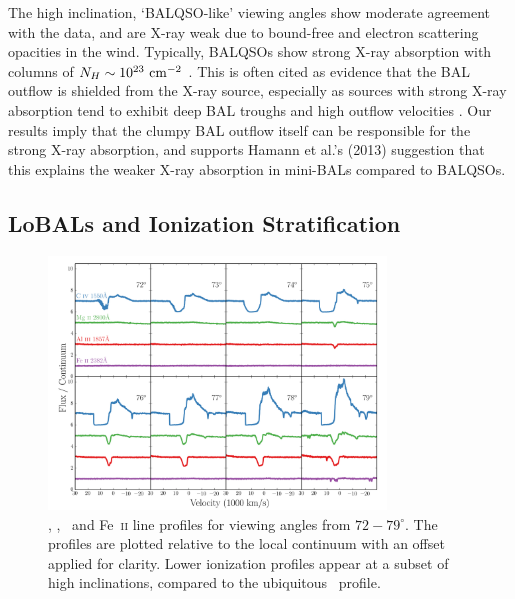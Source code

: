 \documentclass[useAMS,usenatbib]{mn2e_x}
\begin{document}
The high inclination, `BALQSO-like' viewing angles show moderate agreement with the data,
and are X-ray weak due to bound-free and electron scattering opacities in the wind.
Typically, BALQSOs show strong X-ray absorption with columns 
of $N_H\sim10^{23}~\rm{cm^{-2}}$ 
\citep{green1996,mathur2000,green2001,grupemathur2003}.
This is often cited as evidence that the BAL outflow is shielded from
the X-ray source, especially as sources with strong X-ray absorption tend
to exhibit deep BAL troughs and high outflow velocities 
\citep{brandt2000,laorbrandt2002,gallagher2006}.
Our results imply that the clumpy BAL outflow
itself can be responsible for the strong X-ray absorption, 
and supports Hamann et al.'s (2013) suggestion that 
this explains the weaker X-ray absorption in mini-BALs 
compared to BALQSOs.

\subsection{LoBALs and Ionization Stratification}

\begin{figure}
\centering
\includegraphics[width=0.8\textwidth]{figures/c4_angles.png}
\caption
{
\civ , \mg , \al\ and Fe~\textsc{ii} line profiles for viewing angles
from $72-79^\circ$. The profiles are plotted relative to the local
continuum with an offset applied for clarity. Lower ionization
profiles appear at a subset of high inclinations, compared
to the ubiquitous \civ\ profile.
}
\label{fig:lobal}
\end{figure}
\end{document}
